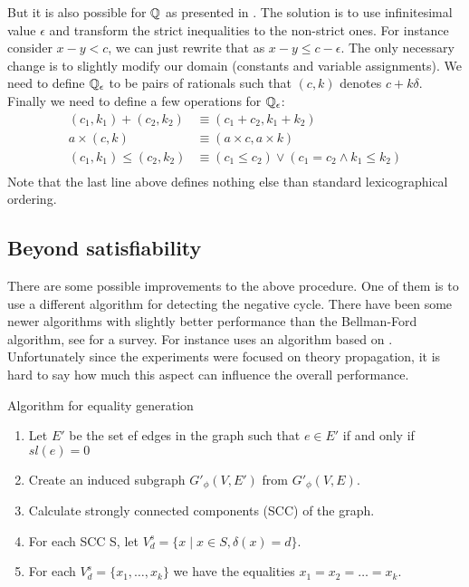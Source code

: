 But it is also possible for $\mathbb{Q}$ as presented in
\cite{bib:arithmetic_dpllt}. The solution is to use infinitesimal value
$\epsilon$ and transform the strict inequalities to the non-strict ones. For
instance consider $x - y < c$, we can just rewrite that as $x - y \leq c -
\epsilon$. The only necessary change is to slightly modify our domain (constants
and variable assignments). We need to define $\mathbb{Q}_\epsilon$ to be pairs of
rationals such that $(c, k)$ denotes $c + k \delta$. Finally we need to define a
few operations for $\mathbb{Q}_\epsilon$:
\begin{align*}
(c_1, k_1) + (c_2, k_2) & \equiv (c_1 + c_2, k_1 + k_2) \\
a \times (c, k) & \equiv (a \times c, a \times k) \\
(c_1, k_1) \leq (c_2, k_2) & \equiv (c_1 \leq c_2) \vee
                                    (c_1 = c_2 \land k_1 \leq k_2) \\
\end{align*}
Note that the last line above defines nothing else than standard lexicographical
ordering.


\subsection{Beyond satisfiability}

There are some possible improvements to the above procedure. One of them is to
use a different algorithm for detecting the negative cycle. There have been some
newer algorithms with slightly better performance than the Bellman-Ford
algorithm, see \cite{bib:negative_cycles} for a survey. For instance
\cite{bib:dl_propagation} uses an algorithm based on
\cite{bib:dynamic_negative_cycle}. Unfortunately since the experiments were
focused on theory propagation, it is hard to say how much this aspect can
influence the overall performance.

\begin{table}[b]
\caption{Algorithm for equality generation}
\label{tab:eq_gen}
\begin{enumerate}
\item Let $E'$ be the set ef edges in the graph such that $e \in E'$ if and only
  if $sl(e) = 0$
\item Create an induced subgraph $G'_\phi(V, E')$ from $G'_\phi(V, E)$.
\item Calculate strongly connected components (SCC) \cite{bib:tarjan_dfs} of the
  graph.
\item For each SCC S, let $V_d^s = \{ x \mid x \in S, \delta(x) = d \}$.
\item For each $V_d^s = \{ x_1, \ldots, x_k \}$ we have the equalities
  $x_1 = x_2 = \ldots = x_k$.
\end{enumerate}
\end{table}

